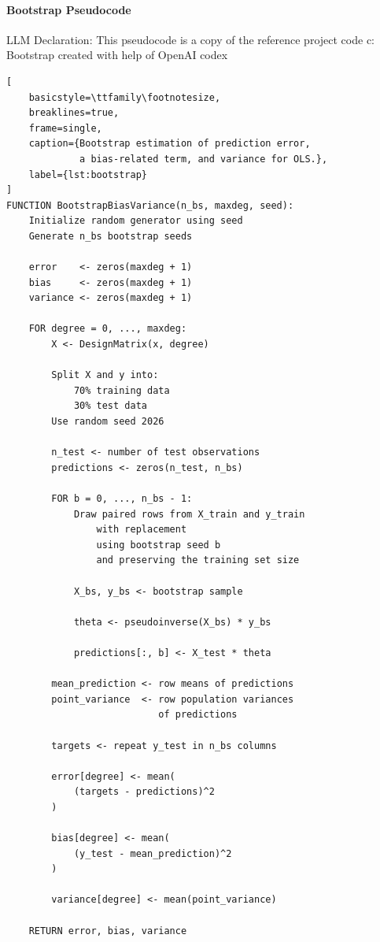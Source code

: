 \documentclass[aps,rmp,reprint,raggedbottom,amsmath,amssymb,longbibliography]{revtex4-1}
\begin{document}
\paragraph{Bootstrap Pseudocode}
LLM Declaration:
This pseudocode is a copy of the reference project code c: Bootstrap \cite{Timholmen96FYSSTK4155Prosjektarbeid}
created with help of OpenAI codex \cite{Codex}
\begin{lstlisting}[
    basicstyle=\ttfamily\footnotesize,
    breaklines=true,
    frame=single,
    caption={Bootstrap estimation of prediction error,
             a bias-related term, and variance for OLS.},
    label={lst:bootstrap}
]
FUNCTION BootstrapBiasVariance(n_bs, maxdeg, seed):
    Initialize random generator using seed
    Generate n_bs bootstrap seeds

    error    <- zeros(maxdeg + 1)
    bias     <- zeros(maxdeg + 1)
    variance <- zeros(maxdeg + 1)

    FOR degree = 0, ..., maxdeg:
        X <- DesignMatrix(x, degree)

        Split X and y into:
            70% training data
            30% test data
        Use random seed 2026

        n_test <- number of test observations
        predictions <- zeros(n_test, n_bs)

        FOR b = 0, ..., n_bs - 1:
            Draw paired rows from X_train and y_train
                with replacement
                using bootstrap seed b
                and preserving the training set size

            X_bs, y_bs <- bootstrap sample

            theta <- pseudoinverse(X_bs) * y_bs

            predictions[:, b] <- X_test * theta

        mean_prediction <- row means of predictions
        point_variance  <- row population variances
                           of predictions

        targets <- repeat y_test in n_bs columns

        error[degree] <- mean(
            (targets - predictions)^2
        )

        bias[degree] <- mean(
            (y_test - mean_prediction)^2
        )

        variance[degree] <- mean(point_variance)

    RETURN error, bias, variance
\end{lstlisting}
\end{document}
